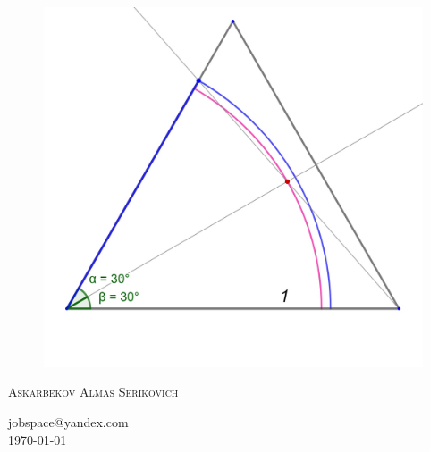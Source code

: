 \documentclass[12pt, letterpaper, oneside]{report}
\begin{document}
\begin{titlepage}
\begin{figure}[h]
\centerline{\includegraphics[scale=0.2]{ds_tr.jpg}}

\label{logo}
\end{figure}
\textsc{\LARGE Askarbekov Almas Serikovich }\\[1.5cm]
\begin{center}
	\large {jobspace@yandex.com}\\
	\today
\end{center}
\end{titlepage}
\end{document}

